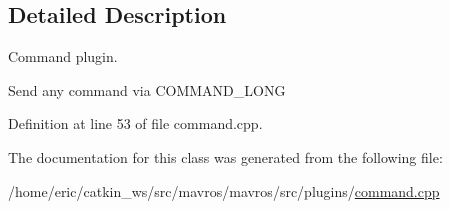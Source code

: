 \subsection{Detailed Description}
Command plugin. 

Send any command via C\+O\+M\+M\+A\+N\+D\+\_\+\+L\+O\+NG 

Definition at line 53 of file command.\+cpp.



The documentation for this class was generated from the following file\+:\begin{DoxyCompactItemize}
\item 
/home/eric/catkin\+\_\+ws/src/mavros/mavros/src/plugins/\mbox{\hyperlink{command_8cpp}{command.\+cpp}}\end{DoxyCompactItemize}
